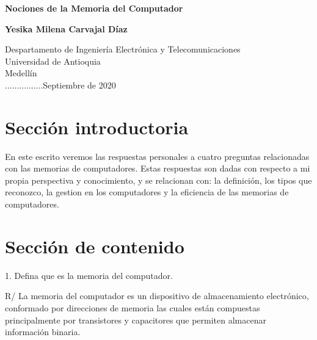 \documentclass{article}
\begin{document}
\begin{titlepage}
    \begin{center}
        \vspace*{1cm}
            
        \Huge
        \textbf{Nociones de la Memoria del Computador}
            
        \vspace{0.5cm}
        \LARGE
            
        \vspace{1.5cm}
            
        \textbf{Yesika Milena Carvajal Díaz}
            
        \vfill
            
        \vspace{0.8cm}
            
        \Large
        Despartamento de Ingeniería Electrónica y Telecomunicaciones\\
        Universidad de Antioquia\\
        Medellín\\
        ................Septiembre de 2020
            
    \end{center}
\end{titlepage}

\tableofcontents

\section{Sección introductoria}

En este escrito veremos las respuestas personales a cuatro preguntas relacionadas con las memorias de computadores. Estas respuestas son dadas con respecto a mi propia perspectiva y conocimiento, y se relacionan con: la definición, los tipos que reconozco, la gestion en los computadores y la eficiencia de las memorias de computadores.

\section{Sección de contenido} \label{contenido}

1. Defina que es la memoria del computador.

\vspace{0.3cm}
R/ La memoria del computador es un dispositivo de almacenamiento electrónico, conformado por direcciones de memoria las cuales están compuestas principalmente por transistores y capacitores que permiten almacenar información binaria.
\end{document}
